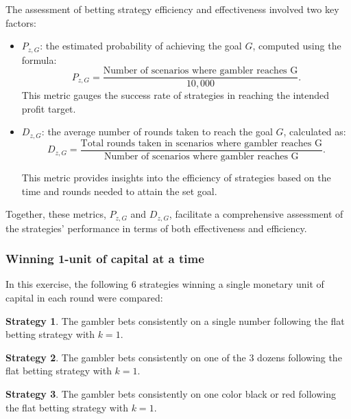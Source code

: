 \documentclass[11pt,twoside]{article}
\numberwithin{Theorem}{section}
\numberwithin{Definition}{section}
\numberwithin{Lemma}{section}
\numberwithin{Algorithm}{section}
\numberwithin{equation}{section}
\begin{document}
The assessment of betting strategy efficiency and effectiveness involved two key factors:
\begin{itemize}
    \item $P_{z,G}$: the estimated probability of achieving the goal $G$, computed using the formula:
  \begin{equation*}
      P_{z,G} = \frac{\text{Number of scenarios where gambler reaches G}}{10,000}.
  \end{equation*}
  This metric gauges the success rate of strategies in reaching the intended profit target.
  \item $D_{z,G}$: the average number of rounds taken to reach the goal $G$, calculated as:
  \begin{equation*}
      D_{z,G} = \frac{\text{Total rounds taken in scenarios where gambler reaches G}}{\text{Number of scenarios where gambler reaches G}}.
  \end{equation*}
  
This metric provides insights into the efficiency of strategies based on the time and rounds needed to attain the set goal.
\end{itemize}

Together, these metrics, $P_{z,G}$ and $D_{z,G}$, facilitate a comprehensive assessment of the strategies' performance in terms of both effectiveness and efficiency.


\subsubsection{Winning 1-unit of capital at a time}
In this exercise, the following 6 strategies winning a single monetary unit of capital in each round were compared: 

\begin{tcolorbox}[colback=gray!10,boxrule=0.25pt]
\textbf{Strategy 1}. The gambler bets consistently on a single number following the flat betting strategy with $k=1$.
\end{tcolorbox}

\begin{tcolorbox}[colback=gray!10,boxrule=0.25pt]
\textbf{Strategy 2}. The gambler bets consistently on one of the 3 dozens following the flat betting strategy with $k=1$.
\end{tcolorbox}

\begin{tcolorbox}[colback=gray!10,boxrule=0.25pt]
\textbf{Strategy 3}. The gambler bets consistently on one color black or red following the flat betting strategy with $k=1$.
\end{tcolorbox}
\end{document}

